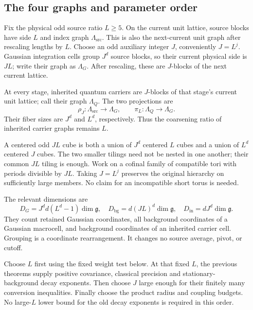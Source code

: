 \documentclass[11pt]{article}
\theoremstyle{remark}
\begin{document}
\subsection{The four graphs and parameter order}
\label{ag-graphs-section}

Fix the physical odd source ratio $L\ge5$. On the current unit
lattice, source blocks have side $L$ and index graph
$\Lambda_{\mathrm{src}}$. This is also the next-current unit graph
after rescaling lengths by $L$. Choose an odd auxiliary integer
$J$, conveniently $J=L^j$. Gaussian integration cells group
$J^d$ source blocks, so their current physical side is $JL$;
write their graph as $\Lambda_G$. After rescaling, these are
$J$-blocks of the next current lattice.

At every stage, inherited quantum carriers are $J$-blocks of
that stage's current unit lattice; call their graph $\Lambda_Q$.
The two projections are
\begin{equation}\label{ag-projections}
 \rho_J:\Lambda_{\mathrm{src}}\longrightarrow\Lambda_G,
 \qquad
 \pi_L:\Lambda_Q\longrightarrow\Lambda_G.
\end{equation}
Their fiber sizes are $J^d$ and $L^d$, respectively. Thus the
coarsening ratio of inherited carrier graphs remains $L$.

A centered odd $JL$ cube is both a union of $J^d$ centered
$L$ cubes and a union of $L^d$ centered $J$ cubes. The two
smaller tilings need not be nested in one another; their common
$JL$ tiling is enough. Work on a cofinal family of compatible
tori with periods divisible by $JL$. Taking $J=L^j$ preserves
the original hierarchy on sufficiently large members. No claim
for an incompatible short torus is needed.

The relevant dimensions are
\begin{equation}\label{ag-dimensions}
 D_G=J^d d(L^d-1)\dim\mathfrak g,
 \quad D_{\mathrm{bg}}=d(JL)^d\dim\mathfrak g,
 \quad D_{\mathrm{in}}=dJ^d\dim\mathfrak g.
\end{equation}
They count retained Gaussian coordinates, all background
coordinates of a Gaussian macrocell, and background coordinates
of an inherited carrier cell. Grouping is a coordinate
rearrangement. It changes no source average, pivot, or cutoff.

Choose $L$ first using the fixed weight test below. At that
fixed $L$, the previous theorems supply positive covariance,
classical precision and stationary-background decay exponents.
Then choose $J$ large enough for their finitely many conversion
inequalities. Finally choose the product radius and coupling
budgets. No large-$L$ lower bound for the old decay exponents
is required in this order.
\end{document}

